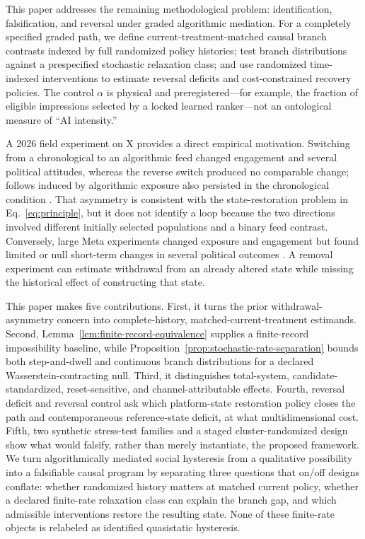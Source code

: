 \documentclass[10pt,a4paper]{article}
\begin{document}
This paper addresses the remaining methodological problem: identification, falsification, and reversal under graded algorithmic mediation. For a completely specified graded path, we define current-treatment-matched causal branch contrasts indexed by full randomized policy histories; test branch distributions against a prespecified stochastic relaxation class; and use randomized time-indexed interventions to estimate reversal deficits and cost-constrained recovery policies. The control $\alpha$ is physical and preregistered---for example, the fraction of eligible impressions selected by a locked learned ranker---not an ontological measure of ``AI intensity.''

A 2026 field experiment on X provides a direct empirical motivation. Switching from a chronological to an algorithmic feed changed engagement and several political attitudes, whereas the reverse switch produced no comparable change; follows induced by algorithmic exposure also persisted in the chronological condition \cite{gauthier2026x}. That asymmetry is consistent with the state-restoration problem in Eq.~\eqref{eq:principle}, but it does not identify a loop because the two directions involved different initially selected populations and a binary feed contrast. Conversely, large Meta experiments changed exposure and engagement but found limited or null short-term changes in several political outcomes \cite{guess2023feeds,nyhan2023likeminded,gonzalez2023segregation,guess2023reshares}. A removal experiment can estimate withdrawal from an already altered state while missing the historical effect of constructing that state.

This paper makes five contributions. First, it turns the prior withdrawal-asymmetry concern into complete-history, matched-current-treatment estimands. Second, Lemma~\ref{lem:finite-record-equivalence} supplies a finite-record impossibility baseline, while Proposition~\ref{prop:stochastic-rate-separation} bounds both step-and-dwell and continuous branch distributions for a declared Wasserstein-contracting null. Third, it distinguishes total-system, candidate-standardized, reset-sensitive, and channel-attributable effects. Fourth, reversal deficit and reversal control ask which platform-state restoration policy closes the path and contemporaneous reference-state deficit, at what multidimensional cost. Fifth, two synthetic stress-test families and a staged cluster-randomized design show what would falsify, rather than merely instantiate, the proposed framework. We turn algorithmically mediated social hysteresis from a qualitative possibility into a falsifiable causal program by separating three questions that on/off designs conflate: whether randomized history matters at matched current policy, whether a declared finite-rate relaxation class can explain the branch gap, and which admissible interventions restore the resulting state. None of these finite-rate objects is relabeled as identified quasistatic hysteresis.
\end{document}
